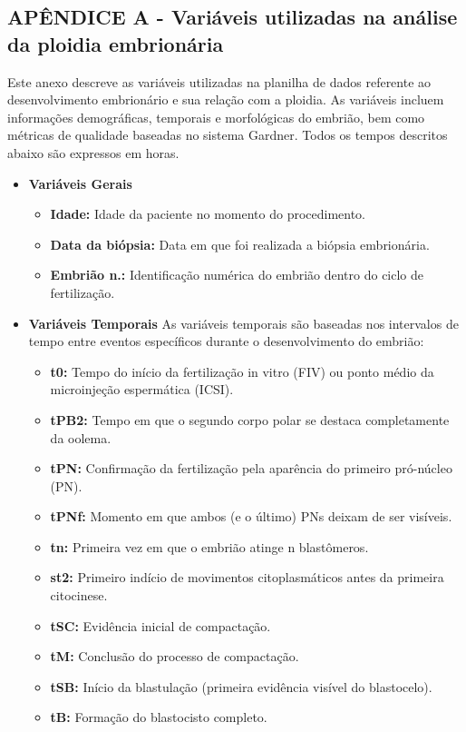 \begin{apendicesenv}

\partapendices

\chapter{APÊNDICE A - Variáveis utilizadas na análise da ploidia embrionária}

Este anexo descreve as variáveis utilizadas na planilha de dados referente ao desenvolvimento embrionário e sua relação com a ploidia. As variáveis incluem informações demográficas, temporais e morfológicas do embrião, bem como métricas de qualidade baseadas no sistema Gardner. Todos os tempos descritos abaixo são expressos em horas.

\begin{itemize}
  \item \textbf{Variáveis Gerais}
  \begin{itemize}
      \item \textbf{Idade:} Idade da paciente no momento do procedimento.
      \item \textbf{Data da biópsia:} Data em que foi realizada a biópsia embrionária.
      \item \textbf{Embrião n.:} Identificação numérica do embrião dentro do ciclo de fertilização.
  \end{itemize}
\end{itemize}

\begin{itemize}
  \item \textbf{Variáveis Temporais}
  As variáveis temporais são baseadas nos intervalos de tempo entre eventos específicos durante o desenvolvimento do embrião:
  \begin{itemize}
    \item \textbf{t0:} Tempo do início da fertilização in vitro (FIV) ou ponto médio da microinjeção espermática (ICSI).
    \item \textbf{tPB2:} Tempo em que o segundo corpo polar se destaca completamente da oolema.
    \item \textbf{tPN:} Confirmação da fertilização pela aparência do primeiro pró-núcleo (PN).
    \item \textbf{tPNf:} Momento em que ambos (e o último) PNs deixam de ser visíveis.
    \item \textbf{tn:} Primeira vez em que o embrião atinge n blastômeros.
    \item \textbf{st2:} Primeiro indício de movimentos citoplasmáticos antes da primeira citocinese.
    \item \textbf{tSC:} Evidência inicial de compactação.
    \item \textbf{tM:} Conclusão do processo de compactação.
    \item \textbf{tSB:} Início da blastulação (primeira evidência visível do blastocelo).
    \item \textbf{tB:} Formação do blastocisto completo.
  \end{itemize}
\end{itemize}


\end{apendicesenv}

